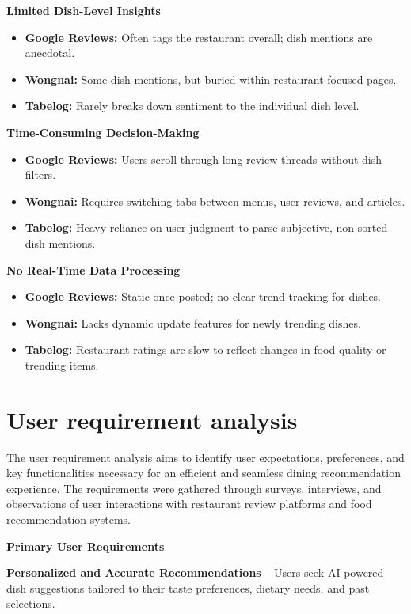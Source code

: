 \textbf{Limited Dish-Level Insights}
\begin{itemize}
	\item \textbf{Google Reviews:} Often tags the restaurant overall; dish mentions are anecdotal.
	\item \textbf{Wongnai:} Some dish mentions, but buried within restaurant-focused pages.
	\item \textbf{Tabelog:} Rarely breaks down sentiment to the individual dish level.
\end{itemize}

\textbf{Time-Consuming Decision-Making}
\begin{itemize}
	\item \textbf{Google Reviews:} Users scroll through long review threads without dish filters.
	\item \textbf{Wongnai:} Requires switching tabs between menus, user reviews, and articles.
	\item \textbf{Tabelog:} Heavy reliance on user judgment to parse subjective, non-sorted dish mentions.
\end{itemize}

\textbf{No Real-Time Data Processing}
\begin{itemize}
	\item \textbf{Google Reviews:} Static once posted; no clear trend tracking for dishes.
	\item \textbf{Wongnai:} Lacks dynamic update features for newly trending dishes.
	\item \textbf{Tabelog:} Restaurant ratings are slow to reflect changes in food quality or trending items.
\end{itemize}

\section{User requirement analysis}

The user requirement analysis aims to identify user expectations, preferences, and key functionalities necessary for an efficient and seamless dining recommendation experience. The requirements were gathered through surveys, interviews, and observations of user interactions with restaurant review platforms and food recommendation systems.

\textbf{Primary User Requirements}

\textbf{Personalized and Accurate Recommendations} -- Users seek AI-powered dish suggestions tailored to their taste preferences, dietary needs, and past selections.

